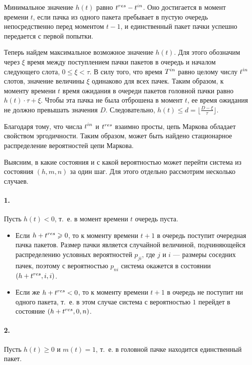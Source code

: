 Минимальное значение $h(t)$ равно $t^{res}-t^{in}$. Оно достигается в момент времени $t$, если пачка из одного пакета пребывает в пустую очередь непосредственно перед моментом $t - 1$, и единственный пакет пачки успешно передается с первой попытки.   

Теперь найдем максимальное возможное значение $h(t)$. Для этого обозначим через $\xi$ время между поступлением пачки пакетов в очередь и началом следующего слота, $0 \leqslant \xi < \tau$. В силу того, что время $T^{in}$ равно целому числу $t^{in}$ слотов, значение величины $\xi$ одинаково для всех пачек. Таким образом, к моменту времени $t$ время ожидания в очереди пакетов головной пачки равно $h(t) \cdot \tau + \xi$. Чтобы эта пачка не была отброшена в момент $t$, ее время ожидания не должно превышать значения $D$. Следовательно, $h(t) \leqslant d = \lfloor \frac{D-\xi}{\tau} \rfloor$. 

Благодаря тому, что числа $t^{in}$ и $t^{res}$ взаимно просты, цепь Маркова обладает свойством эргодичности. Таким образом, может быть найдено стационарное распределение вероятностей цепи Маркова. 

Выясним, в какие состояния и с какой вероятностью может перейти система из состояния $(h, m, n)$ за один шаг. Для этого отдельно рассмотрим несколько случаев.

\paragraph{1.} Пусть $h(t) < 0$, т.~е. в момент времени $t$ очередь пуста. 

\begin{itemize}
\item Если $h + t^{res} \geqslant 0$, то к моменту времени $t + 1$ в очередь поступит очередная пачка пакетов. Размер пачки является случайной величиной, подчиняющейся распределению условных вероятностей $p_{ji}$, где $j$ и $i$ --- размеры соседних пачек,  поэтому с вероятностью $p_{ni}$ система окажется в состоянии $(h + t^{res}, i, i)$. 

\item Если же $h + t^{res} < 0$, то к моменту времени $t + 1$ в очередь  не поступит ни одного пакета, т.~е. в этом случае система с вероятностью $1$ перейдет в состояние $(h + t^{res}, 0, n)$. 
\end{itemize}


\paragraph{2.} Пусть $h(t) \ge 0$ и $m(t) = 1$, т.~е. в головной пачке находится единственный пакет.


